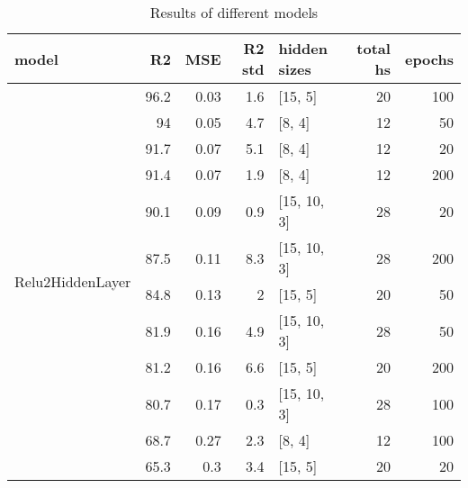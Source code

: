
    \begin{table*}
        \centering
        \begin{tabular}{lrrrlrr}
\hline
 model                              &   R2 &   MSE &   R2 std & hidden sizes   &   total hs &   epochs \\
\hline
 \multirow{12}{*}{Relu2HiddenLayer} & 96.2 &  0.03 &      1.6 & [15, 5]        &         20 &      100 \\
                                    & 94   &  0.05 &      4.7 & [8, 4]         &         12 &       50 \\
                                    & 91.7 &  0.07 &      5.1 & [8, 4]         &         12 &       20 \\
                                    & 91.4 &  0.07 &      1.9 & [8, 4]         &         12 &      200 \\
                                    & 90.1 &  0.09 &      0.9 & [15, 10, 3]    &         28 &       20 \\
                                    & 87.5 &  0.11 &      8.3 & [15, 10, 3]    &         28 &      200 \\
                                    & 84.8 &  0.13 &      2   & [15, 5]        &         20 &       50 \\
                                    & 81.9 &  0.16 &      4.9 & [15, 10, 3]    &         28 &       50 \\
                                    & 81.2 &  0.16 &      6.6 & [15, 5]        &         20 &      200 \\
                                    & 80.7 &  0.17 &      0.3 & [15, 10, 3]    &         28 &      100 \\
                                    & 68.7 &  0.27 &      2.3 & [8, 4]         &         12 &      100 \\
                                    & 65.3 &  0.3  &      3.4 & [15, 5]        &         20 &       20 \\
\hline
\end{tabular}
        \caption{Results of different models}
        \label{models}
    \end{table*}
    
